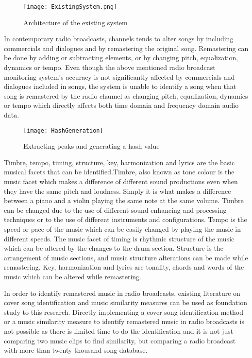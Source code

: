 \vspace{12pt}

\begin{figure}[H]
    \centering
    \texttt{[image: ExistingSystem.png]}
    \caption{Architecture of the existing system}
    \label{fig:existing_system}
\end{figure}
\vspace{12pt}

In contemporary radio broadcasts, channels tends to alter songs by including commercials and dialogues and by remastering 
the original song. Remastering can be done by adding or subtracting elements, or by changing pitch, equalization, dynamics or 
tempo\cite{SerraBook}. Even though the above mentioned radio broadcast monitoring system's accuracy is not significantly 
affected by commercials and dialogues included in songs, the system is unable to identify a song when that song is remastered 
by the radio channel as changing pitch, equalization, dynamics or tempo which directly affects both time domain and 
frequency domain audio data.

\vspace{12pt}

\begin{figure}[H]
    \centering
    \texttt{[image: HashGeneration]}
    \caption{Extracting peaks and generating a hash value\cite{Nishan}}
    \label{fig:fingerprint}
\end{figure}

\vspace{12pt}

Timbre, tempo, timing, structure, key, harmonization and lyrics are the basic musical facets that can be 
identified\cite{SerraBook}.Timbre, also known as tone colour is the music facet which makes a difference of different 
sound productions even when they have the same pitch and loudness. Simply it is what makes a difference between a piano 
and a violin playing the same note at the same volume. Timbre can be changed due to the use of different sound enhancing 
and processing techniques or to the use of different instruments and configurations. Tempo is the speed or pace of the 
music which can be easily changed by playing the music in different speeds. The music facet of timing is rhythmic structure 
of the music which can be altered by the changes to the drum section. Structure is the arrangement of music sections, and
music structure alterations can be made while remastering. Key, harmonization and lyrics are 
tonality, chords and words of the music which can be altered while remastering.
\vspace{12pt}

In order to identify remastered music in radio broadcasts,
existing literature on cover song identification and music similarity measures can be used as foundation study to this 
research. Directly implementing a cover song identification method or a music similarity measure to identify remastered 
music in radio broadcasts is not possible as there is limited time to do the identification and it is not just 
comparing two music clips to find similarity, but comparing a radio broadcast with more than twenty thousand song database.